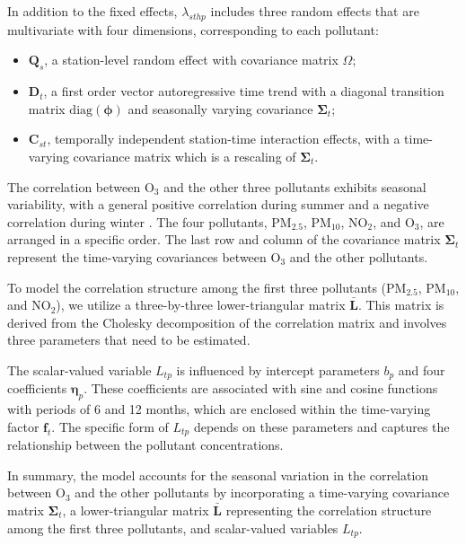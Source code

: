 \documentclass[
  12,
]{article}
\providecommand{\tightlist}{%
  \setlength{\itemsep}{0pt}\setlength{\parskip}{0pt}}
\begin{document}
In addition to the fixed effects, \(\lambda_{sthp}\) includes three
random effects that are multivariate with four dimensions, corresponding
to each pollutant:

\begin{itemize}
    \tightlist
    \item
    $\mathbf{Q}_s$, a station-level random effect with covariance matrix
    $\Omega$;
    \item
    $\mathbf{D}_t$, a first order vector autoregressive time trend with a
    diagonal transition matrix $\mbox{diag}(\mathbf{\phi})$ and
    seasonally varying covariance $\mathbf{\Sigma}_t$; 
    \item
    $\mathbf{C}_{st}$, temporally independent station-time interaction
    effects, with a time-varying covariance matrix which is a rescaling of
    $\mathbf{\Sigma}_t$.
\end{itemize}

The correlation between O\(_3\) and the other three pollutants exhibits
seasonal variability, with a general positive correlation during summer
and a negative correlation during winter \autocite{Huang2022}. The four
pollutants, PM\(_{2.5}\), PM\(_{10}\), NO\(_2\), and O\(_3\), are
arranged in a specific order. The last row and column of the covariance
matrix \(\mathbf{\Sigma}_t\) represent the time-varying covariances
between O\(_3\) and the other pollutants.

To model the correlation structure among the first three pollutants
(PM\(_{2.5}\), PM\(_{10}\), and NO\(_2\)), we utilize a three-by-three
lower-triangular matrix \(\mathbf{\bar{L}}\). This matrix is derived from
the Cholesky decomposition of the correlation matrix and involves three
parameters that need to be estimated.

The scalar-valued variable \(L_{tp}\) is influenced by intercept
parameters \(b_p\) and four coefficients \(\mathbf{\eta}_p\). These
coefficients are associated with sine and cosine functions with periods
of 6 and 12 months, which are enclosed within the time-varying factor
\(\mathbf{f}_t\). The specific form of \(L_{tp}\) depends on these
parameters and captures the relationship between the pollutant
concentrations.

In summary, the model accounts for the seasonal variation in the
correlation between O\(_3\) and the other pollutants by incorporating a
time-varying covariance matrix \(\mathbf{\Sigma}_t\), a lower-triangular
matrix \(\mathbf{\bar{L}}\) representing the correlation structure among
the first three pollutants, and scalar-valued variables \(L_{tp}\).
\end{document}
